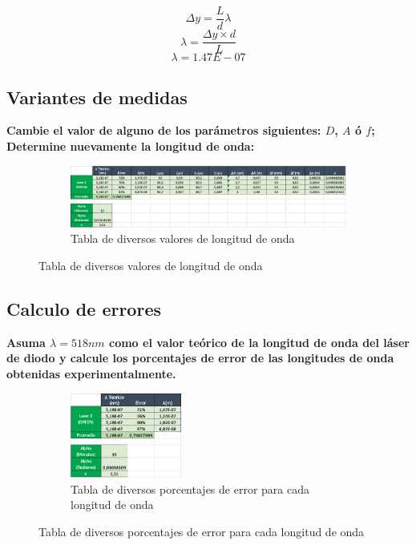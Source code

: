 \[ \Delta y = \frac{L}{d}\lambda \]
\[ \lambda = \frac{\Delta y\times d}{L} \]
\[ \lambda = 1.47E-07 \]

\subsection{Variantes de medidas}
\textbf{Cambie el valor de alguno de los parámetros siguientes: $D$, $A$ ó $f$; Determine nuevamente la longitud de onda:}

\begin{figure}[H]
  \centering
  \begin{subfigure}[b]{\textwidth}
      \centering
      \includegraphics[width=\textwidth]{Figures/1. Content/tabla1.png}
      \caption{Tabla de diversos valores de longitud de onda}
      \label{fig: Diversos valores de longitud de onda}
  \end{subfigure}
  \hfill
\end{figure}

\subsection{Calculo de errores}
\textbf{Asuma $\lambda = 518nm$ como el valor teórico de la longitud de onda del láser de diodo
y calcule los porcentajes de error de las longitudes de onda obtenidas
experimentalmente.}

\begin{figure}[H]
  \centering
  \begin{subfigure}[b]{\textwidth}
      \centering
      \includegraphics[width=0.4\textwidth]{Figures/1. Content/tabla2.png}
      \caption{Tabla de diversos porcentajes de error para cada longitud de onda}
      \label{fig: Tabla de diversos porcentajes de error para cada longitud de onda}
  \end{subfigure}
  \hfill
\end{figure}


